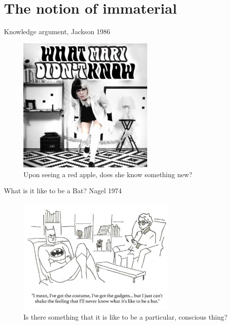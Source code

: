 \documentclass[xcolor=dvipsnames]{beamer}
\begin{document}
\section{The notion of immaterial}


\begin{frame}{Knowledge argument, Jackson 1986}
  \begin{figure}
    \centering
    \includegraphics[width=0.6\textwidth]{mary-song}
    \caption {Upon seeing a red apple, does she know something new?}
  \end{figure}
\end{frame}

\begin{frame}{What is it like to be a Bat? Nagel 1974}
  \begin{figure}
    \centering
    \includegraphics[width=0.7\textwidth]{to-be-a-bat}
    \caption {Is there something that it is like to be a particular, conscious thing?}
  \end{figure}
\end{frame}
\end{document}
